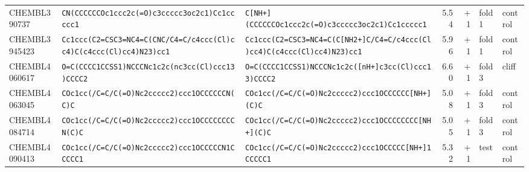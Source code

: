 \begin{longtable}{l p{4.4cm} p{4.4cm} r r l l}
CHEMBL390737 & \texttt{CN(\allowbreak{}CCCCCCOc1ccc2c(\allowbreak{}=\allowbreak{}O)\allowbreak{}c3ccccc3oc2c1)\allowbreak{}Cc1ccccc1} & \texttt{C[NH+]\allowbreak{}(\allowbreak{}CCCCCCOc1ccc2c(\allowbreak{}=\allowbreak{}O)\allowbreak{}c3ccccc3oc2c1)\allowbreak{}Cc1ccccc1} & 5.54 & +1 & fold 1 & control \\
CHEMBL3945423 & \texttt{Cc1ccc(\allowbreak{}C2=\allowbreak{}CSC3=\allowbreak{}NC4=\allowbreak{}C(\allowbreak{}CNC/\allowbreak{}C4=\allowbreak{}C/\allowbreak{}c4ccc(\allowbreak{}Cl)\allowbreak{}cc4)\allowbreak{}C(\allowbreak{}c4ccc(\allowbreak{}Cl)\allowbreak{}cc4)\allowbreak{}N23)\allowbreak{}cc1} & \texttt{Cc1ccc(\allowbreak{}C2=\allowbreak{}CSC3=\allowbreak{}NC4=\allowbreak{}C(\allowbreak{}C[NH2+]\allowbreak{}C/\allowbreak{}C4=\allowbreak{}C/\allowbreak{}c4ccc(\allowbreak{}Cl)\allowbreak{}cc4)\allowbreak{}C(\allowbreak{}c4ccc(\allowbreak{}Cl)\allowbreak{}cc4)\allowbreak{}N23)\allowbreak{}cc1} & 5.96 & +1 & fold 1 & control \\
CHEMBL4060617 & \texttt{O=\allowbreak{}C(\allowbreak{}CCCC1CCSS1)\allowbreak{}NCCCNc1c2c(\allowbreak{}nc3cc(\allowbreak{}Cl)\allowbreak{}ccc13)\allowbreak{}CCCC2} & \texttt{O=\allowbreak{}C(\allowbreak{}CCCC1CCSS1)\allowbreak{}NCCCNc1c2c(\allowbreak{}[nH+]\allowbreak{}c3cc(\allowbreak{}Cl)\allowbreak{}ccc13)\allowbreak{}CCCC2} & 6.60 & +1 & fold 3 & cliff \\
CHEMBL4063045 & \texttt{COc1cc(\allowbreak{}/\allowbreak{}C=\allowbreak{}C/\allowbreak{}C(\allowbreak{}=\allowbreak{}O)\allowbreak{}Nc2ccccc2)\allowbreak{}ccc1OCCCCCCN(\allowbreak{}C)\allowbreak{}C} & \texttt{COc1cc(\allowbreak{}/\allowbreak{}C=\allowbreak{}C/\allowbreak{}C(\allowbreak{}=\allowbreak{}O)\allowbreak{}Nc2ccccc2)\allowbreak{}ccc1OCCCCCC[NH+]\allowbreak{}(\allowbreak{}C)\allowbreak{}C} & 5.08 & +1 & fold 3 & control \\
CHEMBL4084714 & \texttt{COc1cc(\allowbreak{}/\allowbreak{}C=\allowbreak{}C/\allowbreak{}C(\allowbreak{}=\allowbreak{}O)\allowbreak{}Nc2ccccc2)\allowbreak{}ccc1OCCCCCCCCN(\allowbreak{}C)\allowbreak{}C} & \texttt{COc1cc(\allowbreak{}/\allowbreak{}C=\allowbreak{}C/\allowbreak{}C(\allowbreak{}=\allowbreak{}O)\allowbreak{}Nc2ccccc2)\allowbreak{}ccc1OCCCCCCCC[NH+]\allowbreak{}(\allowbreak{}C)\allowbreak{}C} & 5.05 & +1 & fold 3 & control \\
CHEMBL4090413 & \texttt{COc1cc(\allowbreak{}/\allowbreak{}C=\allowbreak{}C/\allowbreak{}C(\allowbreak{}=\allowbreak{}O)\allowbreak{}Nc2ccccc2)\allowbreak{}ccc1OCCCCCN1CCCCC1} & \texttt{COc1cc(\allowbreak{}/\allowbreak{}C=\allowbreak{}C/\allowbreak{}C(\allowbreak{}=\allowbreak{}O)\allowbreak{}Nc2ccccc2)\allowbreak{}ccc1OCCCCC[NH+]\allowbreak{}1CCCCC1} & 5.32 & +1 & test & control \\

\end{longtable}
